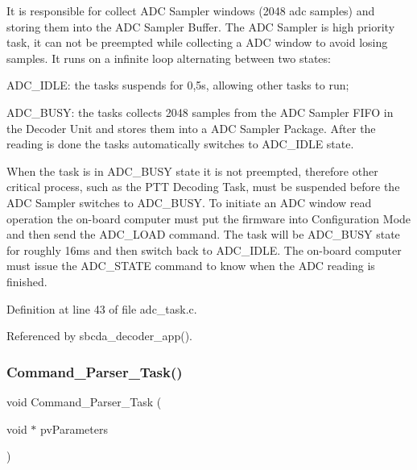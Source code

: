 \begin{DoxyPre}It is responsible for collect ADC Sampler windows (2048 adc samples)
and  storing them into the ADC Sampler Buffer. The ADC Sampler
is high priority task, it  can not be preempted while collecting
a ADC window to avoid losing samples.
It runs on a infinite loop alternating between two states:\end{DoxyPre}



\begin{DoxyPre}
\begin{DoxyItemize}
\item ADC\_IDLE: the tasks suspends for 0,5s, allowing other tasks to run;
\item ADC\_BUSY: the tasks collects 2048 samples from the ADC Sampler FIFO
            in the Decoder Unit and stores them into a ADC Sampler Package.
            After the reading is done the tasks automatically switches to
            ADC\_IDLE state.

When the task is in ADC\_BUSY state it is not preempted,
  therefore other critical process, such as the PTT Decoding Task,
  must be suspended before the ADC Sampler switches to ADC\_BUSY. To
  initiate an ADC window read operation the on-board computer must put the
  firmware into Configuration Mode and then send the ADC\_LOAD command.
  The task will be ADC\_BUSY state for roughly 16ms and then switch
  back to ADC\_IDLE. The on-board computer must issue the
  ADC\_STATE command to know when the ADC reading is finished.

\end{DoxyItemize}\end{DoxyPre}


Definition at line 43 of file adc\+\_\+task.\+c.



Referenced by sbcda\+\_\+decoder\+\_\+app().

\mbox{\label{group___app___tasks_gac9a578724e7472c16d1c3192bd544f98}} 
\subsubsection{\texorpdfstring{Command\+\_\+\+Parser\+\_\+\+Task()}{Command\_Parser\_Task()}}
{\footnotesize\ttfamily void Command\+\_\+\+Parser\+\_\+\+Task (\begin{DoxyParamCaption}\item[{void $\ast$}]{pv\+Parameters }\end{DoxyParamCaption})}

